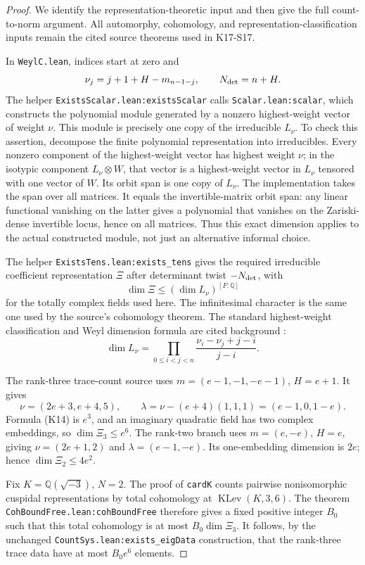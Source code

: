 \begin{proof}
We identify the representation-theoretic input and then give
the full count-to-norm argument. All automorphy, cohomology,
and representation-classification inputs remain the cited
source theorems used in K17-S17.

In \texttt{WeylC.lean}, indices start at zero and
\[
 \nu_j=j+1+H-m_{n-1-j},\qquad N_{\rm det}=n+H.
\]
The helper \texttt{ExistsScalar.lean:existsScalar} calls
\texttt{Scalar.lean:scalar}, which constructs the polynomial
module generated by a nonzero highest-weight vector of
weight \(\nu\). This module is precisely one copy of
the irreducible \(L_\nu\). To check this assertion, decompose
the finite polynomial representation into irreducibles.
Every nonzero component of the highest-weight vector has
highest weight \(\nu\); in the isotypic component
\(L_\nu\otimes W\), that vector is a highest-weight vector
in \(L_\nu\) tensored with one vector of \(W\). Its orbit
span is one copy of \(L_\nu\).
The implementation takes the span over all matrices.
It equals the invertible-matrix orbit span: any linear
functional vanishing on the latter gives a polynomial that
vanishes on the Zariski-dense invertible locus, hence on all
matrices. Thus this exact dimension applies to the actual
constructed module, not just an alternative informal choice.

The helper \texttt{ExistsTens.lean:exists\_tens} gives the
required irreducible coefficient representation \(\Xi\)
after determinant twist \(-N_{\rm det}\), with
\[
 \dim\Xi\le(\dim L_\nu)^{[F:\mathbb Q]}
\]
for the totally complex fields used here. The infinitesimal
character is the same one used by the source's cohomology
theorem. The standard highest-weight classification and Weyl
dimension formula are cited background
\cite[\S\S27.2--27.3 and \S28.1]{EtingofGL2024}:
\[
 \dim L_\nu=\prod_{0\le i<j<n}
       \frac{\nu_i-\nu_j+j-i}{j-i}.                  \tag{K14}
\]

The rank-three trace-count source uses
\(m=(e-1,-1,-e-1)\), \(H=e+1\).
It gives
\[
 \nu=(2e+3,e+4,5),\qquad
 \lambda=\nu-(e+4)(1,1,1)=(e-1,0,1-e).
\]
Formula (K14) is \(e^3\), and an imaginary quadratic
field has two complex embeddings, so \(\dim\Xi_3\le e^6\).
The rank-two branch uses \(m=(e,-e)\), \(H=e\), giving
\(\nu=(2e+1,2)\) and \(\lambda=(e-1,-e)\).
Its one-embedding dimension is \(2e\); hence
\(\dim\Xi_2\le4e^2\).

Fix \(K=\mathbb Q(\sqrt{-3})\), \(N=2\).
The proof of \texttt{cardK} counts pairwise nonisomorphic
cuspidal representations by total cohomology at
\(\operatorname{KLev}(K,3,6)\).
The theorem \texttt{CohBoundFree.lean:cohBoundFree} therefore
gives a fixed positive integer \(B_0\) such that this total
cohomology is at most \(B_0\dim\Xi_3\).
It follows, by the unchanged
\texttt{CountSys.lean:exists\_eigData} construction, that
the rank-three trace data have at most \(B_0e^6\) elements.


\end{proof}
